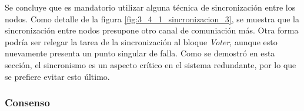 Se concluye que es mandatorio utilizar alguna técnica de sincronización entre los nodos. Como detalle de la figura \ref{fig:3_4_1_sincronizacion_3}, se muestra que la sincronización entre nodos presupone otro canal de comuniación más. Otra forma podría ser relegar la tarea de la sincronización al bloque \textit{Voter}, aunque esto nuevamente presenta un punto singular de falla. Como se demostró en esta sección, el sincronismo es un aspecto crítico en el sistema redundante, por lo que se prefiere evitar esto último.

\subsubsection{Consenso}

